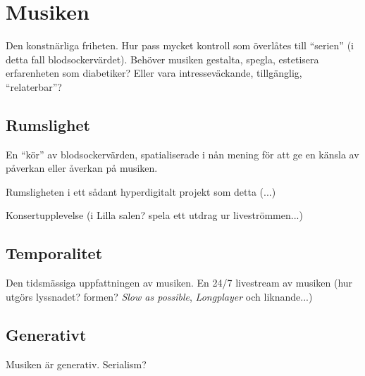 \documentclass[12pt]{article}
\begin{document}
\section{Musiken}
Den konstnärliga friheten. Hur pass mycket kontroll som överlåtes till \enquote{serien} (i detta fall blodsockervärdet). Behöver musiken gestalta, spegla, estetisera erfarenheten som diabetiker? Eller vara intresseväckande, tillgänglig, \enquote{relaterbar}? 

\subsection{Rumslighet}
En \enquote{kör} av blodsockervärden, spatialiserade i nån mening för att ge en känsla av påverkan eller åverkan på musiken. 

Rumsligheten i ett sådant hyperdigitalt projekt som detta (...)

Konsertupplevelse (i Lilla salen? spela ett utdrag ur liveströmmen...)

\subsection{Temporalitet}
Den tidsmässiga uppfattningen av musiken. En 24/7 livestream av musiken (hur utgörs lyssnadet? formen? \emph{Slow as possible}, \emph{Longplayer} och liknande...)

\subsection{Generativt}
Musiken är generativ. Serialism?



\end{document}
